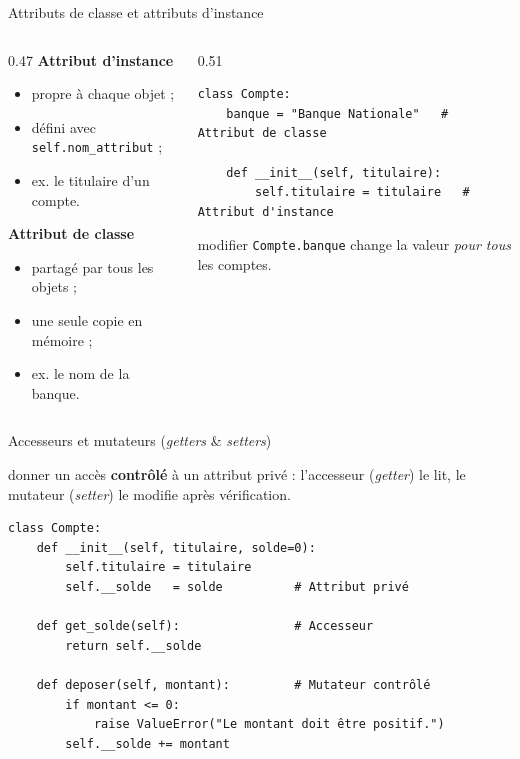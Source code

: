 \documentclass[11pt,aspectratio=169]{beamer}
\newcommand{\py}[1]{\texttt{#1}}
\begin{document}
\begin{frame}[fragile]{Attributs de classe et attributs d'instance}
  \begin{columns}[T,onlytextwidth]
    \begin{column}{0.47\textwidth}
      \textbf{Attribut d'instance}
      \begin{itemize}
        \item propre à chaque objet ;
        \item défini avec \py{self.nom\_attribut} ;
        \item ex. le titulaire d'un compte.
      \end{itemize}
      \smallskip
      \textbf{Attribut de classe}
      \begin{itemize}
        \item partagé par tous les objets ;
        \item une seule copie en mémoire ;
        \item ex. le nom de la banque.
      \end{itemize}
    \end{column}
    \begin{column}{0.51\textwidth}
\begin{lstlisting}
class Compte:
    banque = "Banque Nationale"   # Attribut de classe

    def __init__(self, titulaire):
        self.titulaire = titulaire   # Attribut d'instance
\end{lstlisting}
      \smallskip
      \begin{piege}
        modifier \py{Compte.banque} change la valeur \emph{pour tous} les comptes.
      \end{piege}
    \end{column}
  \end{columns}
\end{frame}

\begin{frame}[fragile]{Accesseurs et mutateurs (\emph{getters} \& \emph{setters})}
  \begin{defi}[Rôle]
    donner un accès \textbf{contrôlé} à un attribut privé : l'accesseur
    (\emph{getter}) le lit, le mutateur (\emph{setter}) le modifie après vérification.
  \end{defi}
\begin{lstlisting}
class Compte:
    def __init__(self, titulaire, solde=0):
        self.titulaire = titulaire
        self.__solde   = solde          # Attribut privé

    def get_solde(self):                # Accesseur
        return self.__solde

    def deposer(self, montant):         # Mutateur contrôlé
        if montant <= 0:
            raise ValueError("Le montant doit être positif.")
        self.__solde += montant
\end{lstlisting}
\end{frame}
\end{document}
